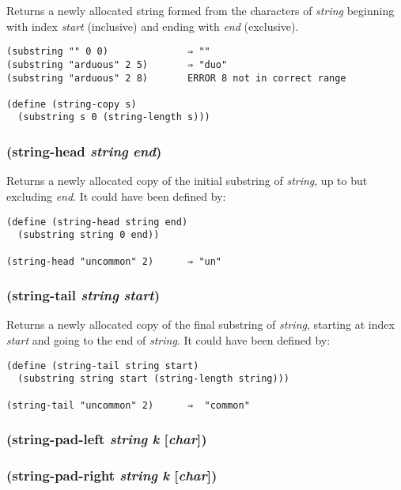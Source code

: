 \documentclass{article}
\begin{document}
Returns a newly allocated string formed from the characters of \emph{string} beginning with
index \emph{start} (inclusive) and ending with \emph{end} (exclusive).

\begin{verbatim}
(substring "" 0 0)              ⇒ ""
(substring "arduous" 2 5)       ⇒ "duo"
(substring "arduous" 2 8)       ERROR 8 not in correct range

(define (string-copy s)
  (substring s 0 (string-length s)))
\end{verbatim}

\subsubsection{(string-head \emph{string} \emph{end})}

Returns a newly allocated copy of the initial substring of \emph{string}, up to but excluding
\emph{end}. It could have been defined by:

\begin{verbatim}
(define (string-head string end)
  (substring string 0 end))

(string-head "uncommon" 2)      ⇒ "un"
\end{verbatim}

\subsubsection{(string-tail \emph{string} \emph{start})}

Returns a newly allocated copy of the final substring of \emph{string}, starting at index
\emph{start} and going to the end of \emph{string}. It could have been defined by:

\begin{verbatim}
(define (string-tail string start)
  (substring string start (string-length string)))

(string-tail "uncommon" 2)      ⇒  "common"
\end{verbatim}

\subsubsection{(string-pad-left \emph{string} \emph{k} [\emph{char}])}

\subsubsection{(string-pad-right \emph{string} \emph{k} [\emph{char}])}
\end{document}
